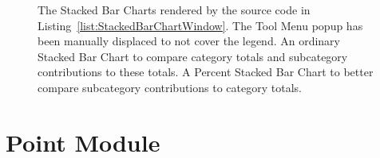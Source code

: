 \begin{figure}[tp]
\centering
{}
\hspace{1cm}
\caption[Stacked Bar Chart Window Example]{%
  The Stacked Bar Charts rendered by the source code in Listing~\ref{list:StackedBarChartWindow}. 
  The Tool Menu popup has been manually displaced to not cover the legend.
   An ordinary Stacked Bar Chart to compare category totals and subcategory contributions to these totals.
   A Percent Stacked Bar Chart to better compare subcategory contributions to category totals. 
}
\label{fig:StackedBarChartWindow}
\end{figure}
  


\section{Point Module}

